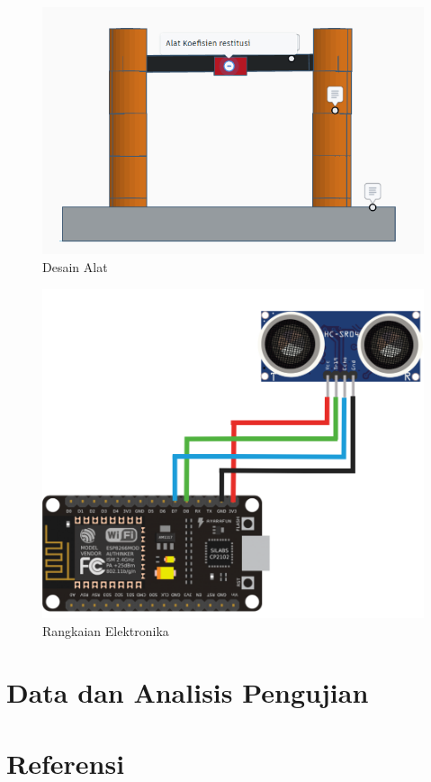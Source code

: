 \documentclass[a4paper, 12pt]{article}
\begin{document}
\begin{figure}[!ht]
    \centering
    \includegraphics[width=0.5\linewidth]{Desain Alat.png}
    \caption{Desain Alat}
    \label{fig:desain-alat}
\end{figure}

\begin{figure}[!ht]
    \centering
    \includegraphics[width=0.5\linewidth]{Rangkaian Elektronika.png}
    \caption{Rangkaian Elektronika}
    \label{fig:rangkaian-elektronika}
\end{figure}

\section{Data dan Analisis Pengujian}

\section{Referensi}
\end{document}
